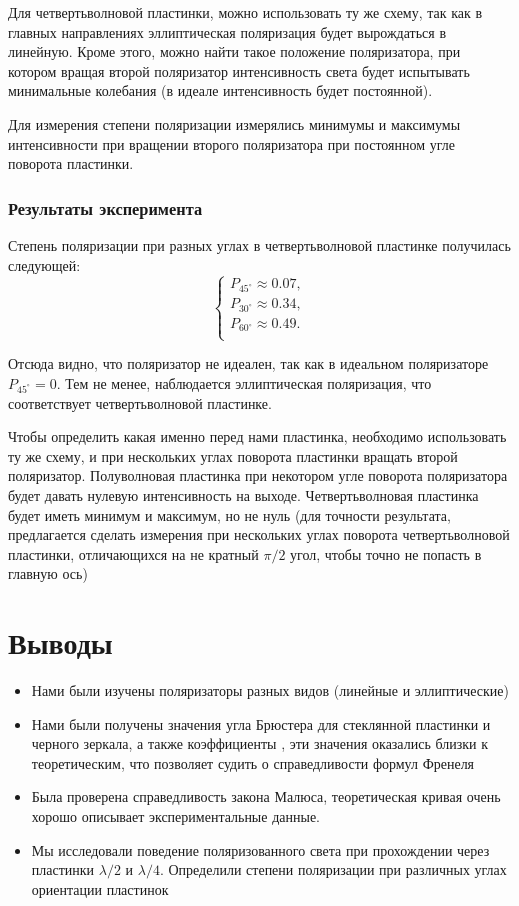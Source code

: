 \documentclass[a4paper,14pt]{extarticle}
\begin{document}
				Для четвертьволновой пластинки, можно использовать ту же схему, так как в главных направлениях эллиптическая поляризация будет вырождаться в линейную. Кроме этого, можно найти такое положение поляризатора, при котором вращая второй поляризатор интенсивность света будет испытывать минимальные колебания (в идеале интенсивность будет постоянной).
				
				Для измерения степени поляризации измерялись минимумы и максимумы интенсивности при вращении второго поляризатора при постоянном угле поворота пластинки.
			\subsubsection{Результаты эксперимента}
				Степень поляризации при разных углах в четвертьволновой пластинке получилась следующей:
				\begin{equation}
					\begin{cases}
						P_{45^\circ} \approx 0.07, \\
						P_{30^\circ} \approx 0.34, \\
						P_{60^\circ} \approx 0.49. \\
					\end{cases}
				\end{equation}
				
				Отсюда видно, что поляризатор не идеален, так как в идеальном поляризаторе $P_{45^\circ} = 0$. Тем не менее, наблюдается эллиптическая поляризация, что соответствует четвертьволновой пластинке.
				
				Чтобы определить какая именно перед нами пластинка, необходимо использовать ту же схему, и при нескольких углах поворота пластинки вращать второй поляризатор. Полуволновая пластинка при некотором угле поворота поляризатора будет давать нулевую интенсивность на выходе. Четвертьволновая пластинка будет иметь минимум и максимум, но не нуль (для точности результата, предлагается сделать измерения при нескольких углах поворота четвертьволновой пластинки, отличающихся на не кратный $\pi / 2$ угол, чтобы точно не попасть в главную ось)
				
	\section{Выводы}
		\begin{itemize}
			\item Нами были изучены поляризаторы разных видов (линейные и эллиптические)
			\item Нами были получены значения угла Брюстера для стеклянной пластинки и черного зеркала, а также коэффициенты , эти значения оказались близки к теоретическим, что позволяет судить о справедливости формул Френеля
			\item Была проверена справедливость закона Малюса, теоретическая кривая очень хорошо описывает экспериментальные данные.
			\item Мы исследовали поведение поляризованного света при прохождении через пластинки $\lambda / 2$ и $\lambda / 4$. Определили степени поляризации при различных углах ориентации пластинок
		\end{itemize}
\end{document}

